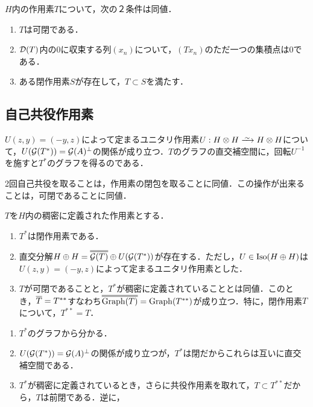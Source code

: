 \documentclass[uplatex,dvipdfmx]{jsreport}
\begin{document}
\begin{lemma}[可閉性の特徴付け]
    $H$内の作用素$T$について，次の２条件は同値．
    \begin{enumerate}
        \item $T$は可閉である．
        \item $\mathcal{D}(T)$内の$0$に収束する列$(x_n)$について，$(Tx_n)$のただ一つの集積点は$0$である．
        \item ある閉作用素$S$が存在して，$T\subset S$を満たす．
    \end{enumerate}
\end{lemma}

\subsection{自己共役作用素}

\begin{tcolorbox}[colframe=ForestGreen, colback=ForestGreen!10!white,breakable,colbacktitle=ForestGreen!40!white,coltitle=black,fonttitle=\bfseries\sffamily,
title=]
    $U(z,y)=(-y,z)$によって定まるユニタリ作用素$U:H\otimes H\iso H\otimes H$について，$U(\mathcal{G}(T^*))=\mathcal{G}(A)^\perp$の関係が成り立つ．$T$のグラフの直交補空間に，回転$U^{-1}$を施すと$T^*$のグラフを得るのである．

    2回自己共役を取ることは，作用素の閉包を取ることに同値．この操作が出来ることは，可閉であることに同値．
\end{tcolorbox}

\begin{theorem}[可閉性の自己共役作用素による特徴付け]\label{thm-closable-and-ajoint-operator}
    $T$を$H$内の稠密に定義された作用素とする．
    \begin{enumerate}
        \item $T^*$は閉作用素である．
        \item 直交分解$H\oplus H=\oo{\cG(T)}\oplus U(\cG(T^*))$が存在する．ただし，$U\in\mathrm{Iso}(H\oplus H)$は$U(z,y)=(-y,z)$によって定まるユニタリ作用素とした．
        \item $T$が可閉であることと，$T^*$が稠密に定義されていることとは同値．このとき，$\overline{T}=T^{**}$すなわち$\oo{\Graph(T)}=\Graph(T^{**})$が成り立つ．特に，閉作用素$T$について，$T^{**}=T$．
    \end{enumerate}
\end{theorem}
\begin{Proof}\mbox{}
    \begin{enumerate}
        \item $T^*$のグラフから分かる．
        \item $U(\mathcal{G}(T^*))=\mathcal{G}(A)^\perp$の関係が成り立つが，$T^*$は閉だからこれらは互いに直交補空間である．
        \item $T^*$が稠密に定義されているとき，さらに共役作用素を取れて，$T\subset T^{**}$だから，$T$は前閉である．逆に，
    \end{enumerate}
\end{Proof}
\end{document}
